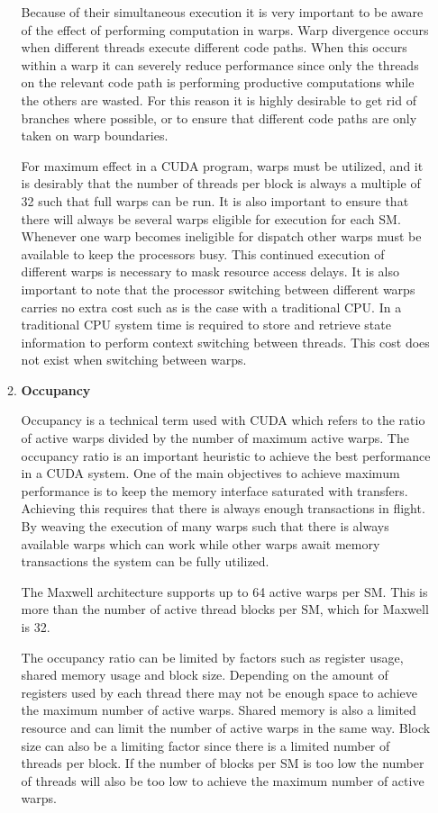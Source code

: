 \begin{enumerate}
\begin{enumerate}
Because of their simultaneous execution it is very important to be aware of the effect of performing computation in warps. Warp divergence occurs when different threads execute different code paths. When this occurs within a warp it can severely reduce performance since only the threads on the relevant code path is performing productive computations while the others are wasted. For this reason it is highly desirable to get rid of branches where possible, or to ensure that different code paths are only taken on warp boundaries.

For maximum effect in a \ac{CUDA} program, warps must be utilized, and it is desirably that the number of threads per block is always a multiple of 32 such that full warps can be run. It is also important to ensure that there will always be several warps eligible for execution for each \ac{SM}. Whenever one warp becomes ineligible for dispatch other warps must be available to keep the processors busy. This continued execution of different warps is necessary to mask resource access delays. It is also important to note that the processor switching between different warps carries no extra cost such as is the case with a traditional \ac{CPU}. In a traditional \ac{CPU} system time is required to store and retrieve state information to perform context switching between threads. This cost does not exist when switching between warps.

\item \textbf{Occupancy}

Occupancy is a technical term used with \ac{CUDA} which refers to the ratio of active warps divided by the number of maximum active warps. The occupancy ratio is an important heuristic to achieve the best performance in a \ac{CUDA} system. One of the main objectives to achieve maximum performance is to keep the memory interface saturated with transfers. Achieving this requires that there is always enough transactions in flight. By weaving the execution of many warps such that there is always available warps which can work while other warps await memory transactions the system can be fully utilized. 

The Maxwell architecture supports up to 64 active warps per \ac{SM}. This is more than the number of active thread blocks per \ac{SM}, which for Maxwell is 32.

The occupancy ratio can be limited by factors such as register usage, shared memory usage and block size. Depending on the amount of registers used by each thread there may not be enough space to achieve the maximum number of active warps. Shared memory is also a limited resource and can limit the number of active warps in the same way. Block size can also be a limiting factor since there is a limited number of threads per block. If the number of blocks per \ac{SM} is too low the number of threads will also be too low to achieve the maximum number of active warps.


\end{enumerate}
\end{enumerate}
